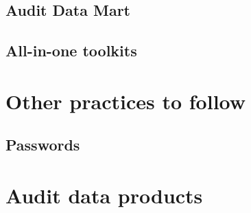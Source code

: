 \documentclass[
]{book}
\begin{document}
\hypertarget{audit-data-mart}{%
\section{Audit Data Mart}\label{audit-data-mart}}

\hypertarget{all-in-one-toolkits}{%
\section{All-in-one toolkits}\label{all-in-one-toolkits}}

\hypertarget{other-practices-to-follow}{%
\chapter{Other practices to follow}\label{other-practices-to-follow}}

\hypertarget{passwords}{%
\section{Passwords}\label{passwords}}

\hypertarget{section}{%
\section{}\label{section}}

\hypertarget{audit-data-products}{%
\chapter{Audit data products}\label{audit-data-products}}

  
\end{document}
